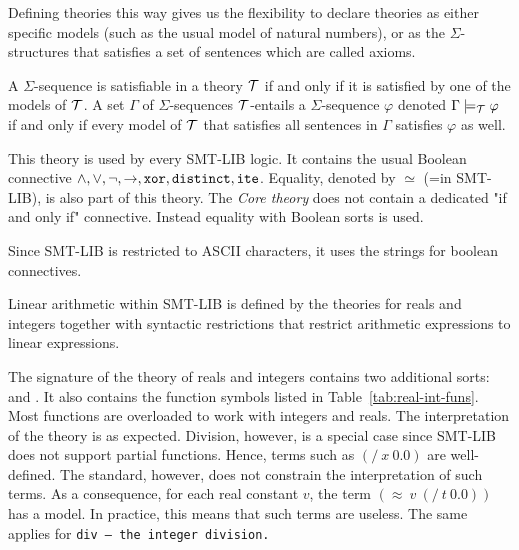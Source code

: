 Defining theories this way gives us the flexibility to declare theories as
either specific models (such as the usual model of natural numbers), or as
the $\Sigma$-structures that satisfies a set of sentences which are called axioms.

\begin{definition}
A $\Sigma$-sequence is satisfiable in a theory $\cal{T}$ if and only if it is satisfied by one of the models
of $\cal{T}$. A set $\Gamma$ of $\Sigma$-sequences $\cal{T}$-entails a $\Sigma$-sequence $\varphi$ denoted
$\Gamma \models_{\cal{T}} \varphi$ if and only if every model of $\cal{T}$ that satisfies all sentences in $\Gamma$ satisfies $\varphi$ as well.
\end{definition}


\begin{definition}
This theory is used by every SMT-LIB logic. It contains the usual Boolean connective $\land, \lor, \neg, \to, \kw{xor}, \kw{distinct}, \kw{ite}$.
Equality, denoted by $\simeq$ (=in SMT-LIB), is also part of this theory.
The \emph{Core theory} does not contain a dedicated "if and only if" connective.
Instead equality with Boolean sorts is used.
\end{definition}


\begin{remark}
Since SMT-LIB is restricted to ASCII characters, it uses the strings  for boolean connectives. 
\end{remark}

\begin{definition}
Linear arithmetic within SMT-LIB is defined by the theories for reals and integers together with syntactic restrictions that restrict arithmetic expressions to linear expressions.
\end{definition}

The signature of the theory of reals and integers contains two additional sorts:  and . 
It also contains the function symbols listed in Table~\ref{tab:real-int-funs}.
Most functions are overloaded to work with integers and reals.
The interpretation of the theory is as expected.
Division, however, is a special case since SMT-LIB does not support partial functions.
Hence, terms such as \((/~x~0.0)\) are well-defined. The standard, however, does not constrain the interpretation of such terms.
As a consequence, for each real constant \(v\), the term \((\approx~v~(/~t~0.0))\) has a model.
In practice, this means that such terms are useless.
The same applies for \tt{div} – the integer division.


